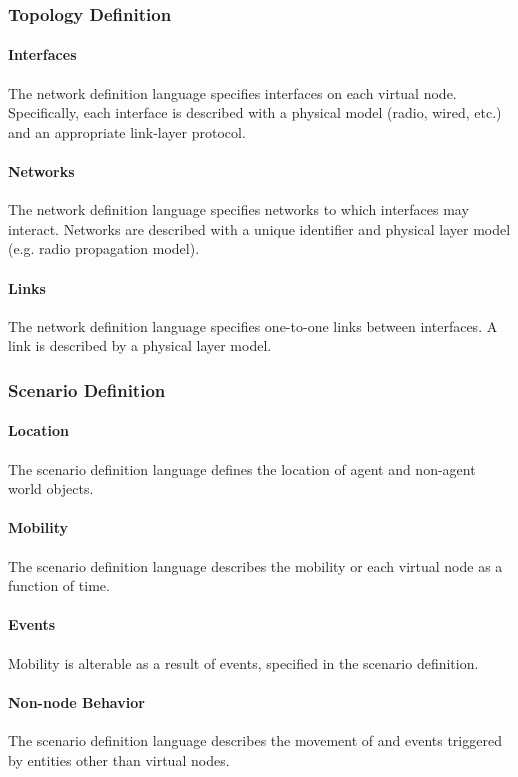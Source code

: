 \documentclass[titlepage]{article}
\begin{document}
\subsubsection{Topology Definition}
	\paragraph{Interfaces} The network definition language specifies interfaces on each virtual node.  Specifically, each interface is described with a physical model (radio, wired, etc.) and an appropriate link-layer protocol.
	\paragraph{Networks} The network definition language specifies networks to which interfaces may interact.  Networks are described with a unique identifier and physical layer model (e.g. radio propagation model).
	\paragraph{Links} The network definition language specifies one-to-one links between interfaces.  A link is	described by a physical layer model.

\subsubsection{Scenario Definition}
	\paragraph{Location} The scenario definition language defines the location of agent and non-agent world objects.
	\paragraph{Mobility} The scenario definition language describes the mobility or each virtual node as a function of time.
	\paragraph{Events} Mobility is alterable as a result of events, specified in the scenario definition.
	\paragraph{Non-node Behavior} The scenario definition language describes the movement of and events triggered by entities other than virtual nodes.
\end{document}
